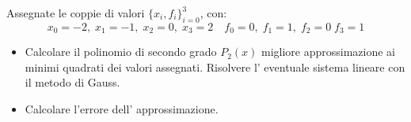 Assegnate le coppie di valori $\{x_i,f_i \}_{i=0}^3$, con:
\[ x_0=-2, \; x_1=-1, \; x_2=0, \; x_3=2 \quad f_0=0, \; f_1=1, \; f_2=0 \; f_3=1 \]
\begin{itemize}
\item Calcolare il polinomio di secondo grado $P_2(x)$
migliore approssimazione ai minimi quadrati dei valori assegnati.
Risolvere l' eventuale sistema lineare con il metodo di Gauss.
\item Calcolare l'errore dell' approssimazione.
\end {itemize}
